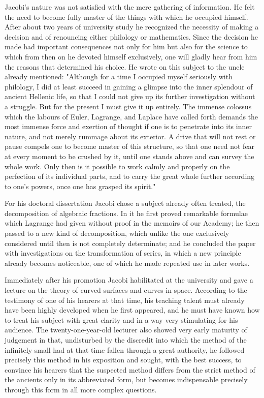 \documentclass[11pt]{article}
\begin{document}
Jacobi's nature was not satisfied with the mere gathering of information. He felt the need to become fully master of the things with which he occupied himself. After about two years of university study he recognized the necessity of making a decision and of renouncing either philology or mathematics. Since the decision he made had important consequences not only for him but also for the science to which from then on he devoted himself exclusively, one will gladly hear from him the reasons that determined his choice. He wrote on this subject to the uncle already mentioned: "Although for a time I occupied myself seriously with philology, I did at least succeed in gaining a glimpse into the inner splendour of ancient Hellenic life, so that I could not give up its further investigation without a struggle. But for the present I must give it up entirely. The immense colossus which the labours of Euler, Lagrange, and Laplace have called forth demands the most immense force and exertion of thought if one is to penetrate into its inner nature, and not merely rummage about its exterior. A drive that will not rest or pause compels one to become master of this structure, so that one need not fear at every moment to be crushed by it, until one stands above and can survey the whole work. Only then is it possible to work calmly and properly on the perfection of its individual parts, and to carry the great whole further according to one's powers, once one has grasped its spirit."

For his doctoral dissertation Jacobi chose a subject already often treated, the decomposition of algebraic fractions. In it he first proved remarkable formulae which Lagrange had given without proof in the memoirs of our Academy; he then passed to a new kind of decomposition, which unlike the one exclusively considered until then is not completely determinate; and he concluded the paper with investigations on the transformation of series, in which a new principle already becomes noticeable, one of which he made repeated use in later works.

Immediately after his promotion Jacobi habilitated at the university and gave a lecture on the theory of curved surfaces and curves in space. According to the testimony of one of his hearers at that time, his teaching talent must already have been highly developed when he first appeared, and he must have known how to treat his subject with great clarity and in a way very stimulating for his audience. The twenty-one-year-old lecturer also showed very early maturity of judgement in that, undisturbed by the discredit into which the method of the infinitely small had at that time fallen through a great authority, he followed precisely this method in his exposition and sought, with the best success, to convince his hearers that the suspected method differs from the strict method of the ancients only in its abbreviated form, but becomes indispensable precisely through this form in all more complex questions.
\end{document}
